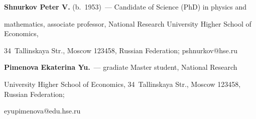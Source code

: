       \noindent

      \textbf{Shnurkov Peter V.} (b.\ 1953)~--- Candidate of Science (PhD) in physics and 

mathematics, associate professor, National Research University Higher School of Economics, 

34~Tallinskaya Str., Moscow 123458, Russian Federation; \mbox{pshnurkov@hse.ru}

     

     \vspace*{3pt}

     

     \noindent

     \textbf{Pimenova Ekaterina Yu.}~--- gradiate Master student, National Research 

University Higher School of Economics, 34~Tallinskaya Str., Moscow 123458, Russian Federation; 

\mbox{eyupimenova@edu.hse.ru} 



\label{end\stat}





\renewcommand{\bibname}{\protect\rm Литература}

